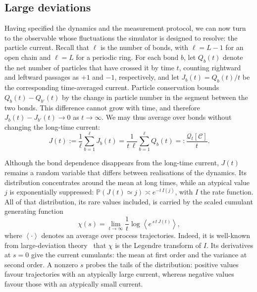 \documentclass[11pt]{article}
\begin{document}
\subsection{Large deviations}
\label{sec:largedeviations}

Having specified the dynamics and the measurement protocol, we can now turn to the observable whose fluctuations the simulator is designed to resolve: the particle current. Recall that $\ell$ is the number of bonds, with $\ell=L-1$ for an open chain and $\ell=L$ for a periodic ring. For each bond $b$, let $Q_b(t)$ denote the net number of particles that have crossed it by time $t$, counting rightward and leftward passages as $+1$ and $-1$, respectively, and let $J_b(t)=Q_b(t)/t$ be the corresponding time-averaged current. Particle conservation bounds $Q_b(t)-Q_{b'}(t)$ by the change in particle number in the segment between the two bonds. This difference cannot grow with time, and therefore $J_b(t)-J_{b'}(t)\to0$ as $t\to\infty$. We may thus average over bonds without changing the long-time current:
\begin{equation}
    J(t) := \frac{1}{\ell}\sum_{b=1}^{\ell} J_b(t)
    = \frac{1}{t\,\ell}\sum_{b=1}^{\ell} Q_b(t)
    =:\frac{\mathcal{Q}_t[\mathcal{C}]}{t}.
\end{equation}

Although the bond dependence disappears from the long-time current, $J(t)$ remains a random variable that differs between realisations of the dynamics. Its distribution concentrates around the mean at long times, while an atypical value $j$ is exponentially suppressed:
$\mathbb{P}\left(J(t) \simeq j\right) \asymp e^{-t\,I(j)}$, with $I$ the rate
function. All of that distribution, its rare values included, is carried by the scaled cumulant generating function
\begin{equation}
    \chi(s) = \lim_{t \to \infty} \frac{1}{t}
    \log \left\langle e^{\,s\,t\,J(t)} \right\rangle,
    \label{eq:cgf-definition}
\end{equation}
where $\left\langle \cdot \right\rangle$ denotes an average over process trajectories. Indeed, it is well-known from large-deviation theory~\cite{touchette2009large} that $\chi$ is the Legendre transform of $I$. Its derivatives at $s = 0$ give the current cumulants: the mean at first order and the variance at second order. A nonzero $s$ probes the tails of the distribution: positive values favour trajectories with an atypically large current, whereas negative values favour those with an atypically small current.
\end{document}
